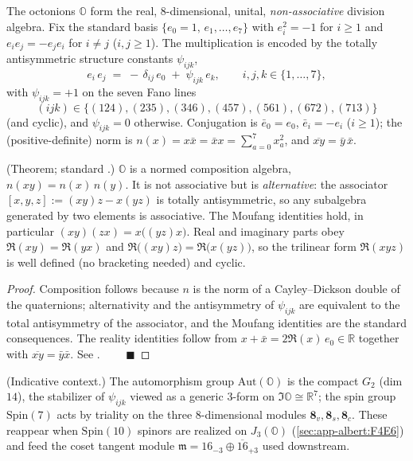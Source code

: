 \begin{definition}[Octonions]\label{def:app-albert:octonions}
The octonions $\mathbb O$ form the real, $8$-dimensional, unital,
\emph{non-associative} division algebra. Fix the standard basis
$\{e_0=1,\,e_1,\dots,e_7\}$ with $e_i^2=-1$ for $i\ge 1$ and $e_i e_j=-e_j e_i$
for $i\neq j$ ($i,j\ge 1$). The multiplication is encoded by the totally
antisymmetric structure constants $\psi_{ijk}$,
\begin{equation}\label{eq:app-albert:struct}
  e_i\, e_j \;=\; -\,\delta_{ij}\,e_0 \;+\; \psi_{ijk}\,e_k ,
  \qquad i,j,k\in\{1,\dots,7\},
\end{equation}
with $\psi_{ijk}=+1$ on the seven Fano lines
\begin{equation}\label{eq:app-albert:fano}
  (ijk)\in\bigl\{(124),(235),(346),(457),(561),(672),(713)\bigr\}
\end{equation}
(and cyclic), and $\psi_{ijk}=0$ otherwise. Conjugation is
$\bar e_0=e_0$, $\bar e_i=-e_i$ ($i\ge1$); the (positive-definite) norm is
$n(x)=x\bar x=\bar x x=\sum_{a=0}^{7}x_a^2$, and $\overline{xy}=\bar y\,\bar x$.
\end{definition}

\begin{theorem}\label{thm:app-albert:moufang}
\textup{(Theorem; standard \cite{Baez:2002,Springer:2000}.)}
$\mathbb O$ is a normed composition algebra, $n(xy)=n(x)\,n(y)$. It is not
associative but is \emph{alternative}: the associator
$[x,y,z]:=(xy)z-x(yz)$ is totally antisymmetric, so any subalgebra generated by
two elements is associative. The Moufang identities hold, in particular
$(xy)(zx)=x\bigl((yz)x\bigr)$. Real and imaginary parts obey
$\Re(xy)=\Re(yx)$ and $\Re\bigl((xy)z\bigr)=\Re\bigl(x(yz)\bigr)$, so the
trilinear form $\Re(xyz)$ is well defined (no bracketing needed) and cyclic.
\end{theorem}

\begin{proof}
Composition follows because $n$ is the norm of a Cayley--Dickson double of the
quaternions; alternativity and the antisymmetry of $\psi_{ijk}$ are equivalent to
the total antisymmetry of the associator, and the Moufang identities are the
standard consequences. The reality identities follow from
$x+\bar x=2\Re(x)\,e_0\in\mathbb R$ together with $\overline{xy}=\bar y\bar x$.
See \cite{Baez:2002,Schafer:1966}. $\qquad\blacksquare$
\end{proof}

\begin{remark}\label{rmk:app-albert:g2}
\textup{(Indicative context.)}
The automorphism group $\mathrm{Aut}(\mathbb O)$ is the compact $G_2$ (dim $14$),
the stabilizer of $\psi_{ijk}$ viewed as a generic $3$-form on $\Im\mathbb O\cong
\mathbb R^7$; the spin group $\mathrm{Spin}(7)$ acts by triality on the three
$8$-dimensional modules $\mathbf 8_v,\mathbf 8_s,\mathbf 8_c$. These reappear when
$\mathrm{Spin}(10)$ spinors are realized on $J_3(\mathbb O)$
(\autoref{sec:app-albert:F4E6}) and feed the coset tangent module
$\mathfrak m=16_{-3}\oplus\overline{16}_{+3}$ used downstream.
\end{remark}

